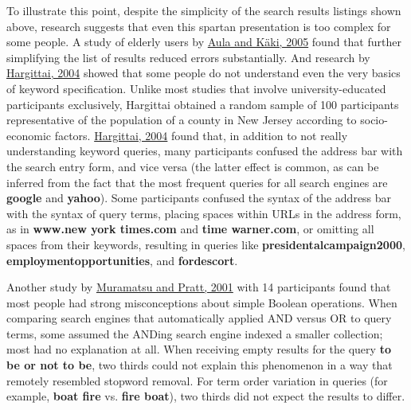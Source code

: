 \documentclass[sigconf,nonacm,screen,pbalance]{acmart}
\begin{document}
To illustrate this point, despite the simplicity of the search results listings shown above, research
suggests that even this spartan presentation is too complex for some people. A study of elderly users by
\href{https://searchuserinterfaces.com/book/sui_references.html#aula2005lim}{Aula and Käki, 2005} found that further simplifying the list of
results reduced errors substantially. And research by \href{https://searchuserinterfaces.com/book/sui_references.html#hargittai2004cac}{Hargittai, 2004} showed that some people do
not understand even the very basics of keyword specification. Unlike most studies that involve
university-educated participants exclusively, Hargittai obtained a random sample of 100 participants
representative of the population of a county in New Jersey according to socio-economic factors. \href{https://searchuserinterfaces.com/book/sui_references.html#hargittai2004cac}{Hargittai, 2004} found that, in addition to
not really understanding keyword queries, many participants confused the address bar with the search entry
form, and vice versa (the latter effect is common, as can be inferred from the fact that the most frequent
queries for all search engines are {\bf  google} and {\bf  yahoo}). Some participants confused the
syntax of the address bar with the syntax of query terms, placing spaces within URLs in the address form,
as in {\bf  www.new york times.com} and {\bf  time warner.com}, or omitting all spaces from their
keywords, resulting in queries like {\bf  presidentalcampaign2000}, {\bf  employmentopportunities}, and
{\bf  fordescort}.

Another study by \href{https://searchuserinterfaces.com/book/sui_references.html#muramatsu2001tqi}{Muramatsu and Pratt, 2001} with 14 participants found that most people had strong misconceptions
about simple Boolean operations. When comparing search engines that automatically applied AND versus OR to
query terms, some assumed the ANDing search engine indexed a smaller collection; most had no explanation
at all. When receiving empty results for the query {\bf  to be or not to be}, two thirds could not
explain this phenomenon in a way that remotely resembled stopword removal. For term order variation in
queries (for example, {\bf  boat fire} vs. {\bf  fire boat}), two thirds did not expect the results to
differ.
\end{document}
